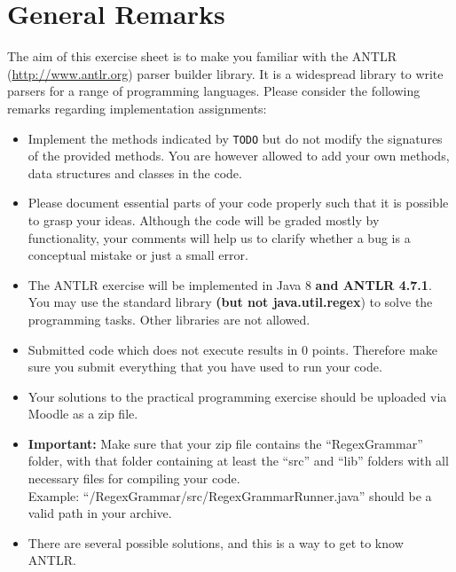 \documentclass[a4paper]{article}
\begin{document}

\section*{General Remarks}
The aim of this exercise sheet is to make you familiar with the ANTLR (\url{http://www.antlr.org}) parser builder library. It is a widespread library to write parsers for a range of programming languages.
Please consider the following remarks regarding implementation assignments:
\begin{itemize}
  \item Implement the methods indicated by \texttt{TODO} but do not modify the signatures of the provided methods. You are however allowed to add your own methods, data structures and classes in the code.
  \item Please document essential parts of your code properly such that it is possible to grasp your ideas. Although the code will be graded mostly by functionality, your comments will help us to clarify whether a bug is a conceptual mistake or just a small error.
  \item The ANTLR exercise will be implemented in Java 8 \textbf{and ANTLR 4.7.1}. You may use the standard library \textbf{(but not java.util.regex}) to solve the programming tasks. Other libraries are not allowed.
  \item Submitted code which does not execute results in 0 points. Therefore make sure you submit everything that you have used to run your code.
  \item Your solutions to the practical programming exercise should be uploaded via Moodle as a zip file.
  \item \textbf{Important:} Make sure that your zip file contains the ``RegexGrammar'' folder, with that folder containing at least the ``src'' and ``lib'' folders with all necessary files for compiling your code.\\Example: ``/RegexGrammar/src/RegexGrammarRunner.java'' should be a valid path in your archive.
  \item There are several possible solutions, and this is a way to get to know ANTLR. %
\end{itemize}
\end{document}

